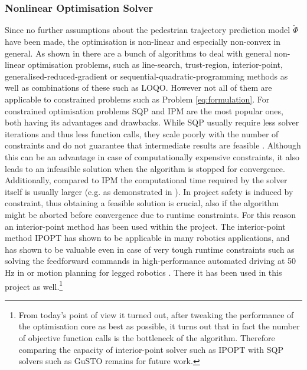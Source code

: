 \subsubsection{Nonlinear Optimisation Solver} 
Since no further assumptions about the pedestrian trajectory prediction model $\tilde{\Phi}$ have been made, the optimisation is non-linear and especially non-convex in general. As shown in \cite{Gould2003}\cite{Parkinson2018}\cite{Freund2004} there are a bunch of algorithms to deal with general non-linear optimisation problems, such as line-search, trust-region, interior-point, generalised-reduced-gradient or sequential-quadratic-programming methods as well as combinations of these such as LOQO. However not all of them are applicable to constrained problems such as Problem \ref{eq:formulation}. For constrained optimisation problems \ac{SQP} and \ac{IPM} are the most popular ones, both having its advantages and drawbacks. While \ac{SQP} usually require less solver iterations and thus less function calls, they scale poorly with the number of constraints and do not guarantee that intermediate results are feasible \cite{Dehdari2013}\cite{Parkinson2018}. Although this can be an advantage in case of computationally expensive constraints, it also leads to an infeasible solution when the algorithm is stopped for convergence. Additionally, compared to \ac{IPM} the computational time required by the solver itself is usually larger (e.g. as demonstrated in \cite{Dehdari2013}).
\newline
In project \project safety is induced by constraint, thus obtaining a feasible solution is crucial, also if the algorithm might be aborted before convergence due to runtime constraints. For this reason an interior-point method has been used within the project. The interior-point method \ac{IPOPT} \cite{Wachter2006} has shown to be applicable in many robotics applications, and has shown to be valuable even in case of very tough runtime constraints such as solving the feedforward commands in high-performance automated driving at 50 Hz in \cite{Spielberge2019} or motion planning for legged robotics \cite{Winkler2018}. There it has been used in this project as well.\footnote{From today's point of view it turned out, after tweaking the performance of the optimisation core as best as possible, it turns out that in fact the number of objective function calls is the bottleneck of the algorithm. Therefore comparing the capacity of interior-point solver such as \ac{IPOPT} with \ac{SQP} solvers such as \ac{GuSTO} remains for future work.} 

